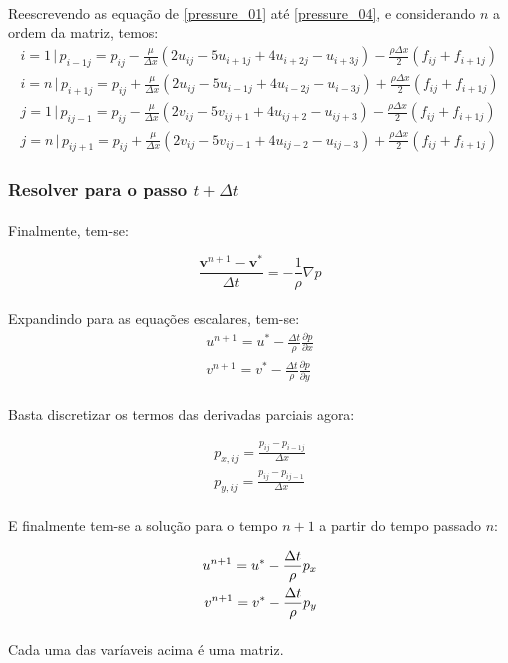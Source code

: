 \documentclass[poisson.tex]{subfiles}
\begin{document}
\paragraph{} Reescrevendo as equação de \ref{pressure_01} até \ref{pressure_04}, e considerando $n$ a ordem da matriz, temos:
\begin{eqnarray}
i=1 \,|\, p_{i-1j}=p_{ij}-\frac{\mu}{\Delta x}\left(2u_{ij}-5u_{i+1j}+4u_{i+2j}-u_{i+3j}\right)-\frac{\rho\Delta x}{2}(f_{ij}+f_{i+1j})\\
i=n \,|\, p_{i+1j}=p_{ij}+\frac{\mu}{\Delta x}\left(2u_{ij}-5u_{i-1j}+4u_{i-2j}-u_{i-3j}\right)+\frac{\rho\Delta x}{2}(f_{ij}+f_{i+1j})\\
j=1 \,|\, p_{ij-1}=p_{ij}-\frac{\mu}{\Delta x}\left(2v_{ij}-5v_{ij+1}+4u_{ij+2}-u_{ij+3}\right)-\frac{\rho\Delta x}{2}(f_{ij}+f_{i+1j})\\
j=n \,|\, p_{ij+1}=p_{ij}+\frac{\mu}{\Delta x}\left(2v_{ij}-5v_{ij-1}+4u_{ij-2}-u_{ij-3}\right)+\frac{\rho\Delta x}{2}(f_{ij}+f_{i+1j})
\end{eqnarray}
\subsubsection{Resolver para o passo $t+\Delta t$}
\paragraph{} Finalmente, tem-se: 

\begin{equation}
\frac{\textbf{v}^{n+1}-\textbf{v}^*}{\Delta t}=-\frac{1}{\rho}\nabla p
\end{equation}
\paragraph{} Expandindo para as equações escalares, tem-se:
\begin{eqnarray}
u^{n+1}=u^*-\frac{\Delta t}{\rho}\frac{\partial p}{\partial x}\\
v^{n+1}=v^*-\frac{\Delta t}{\rho}\frac{\partial p}{\partial y}
\end{eqnarray}
\paragraph{} Basta discretizar os termos das derivadas parciais agora:

\begin{eqnarray}
p_{x,ij}=\frac{p_{ij}-p_{i-1j}}{\Delta x}\\
p_{y,ij}=\frac{p_{ij}-p_{ij-1}}{\Delta x}
\end{eqnarray}

\paragraph{} E finalmente tem-se a solução para o tempo $n+1$ a partir do tempo passado $n$:

\begin{eqnarray}
{u}^{n+1}={u}^*-\frac{\Delta t}{\rho}p_{x}\\
{v}^{n+1}={v}^*-\frac{\Delta t}{\rho}p_{y}
\end{eqnarray}
\paragraph{} Cada uma das varíaveis acima é uma matriz.
\end{document}
